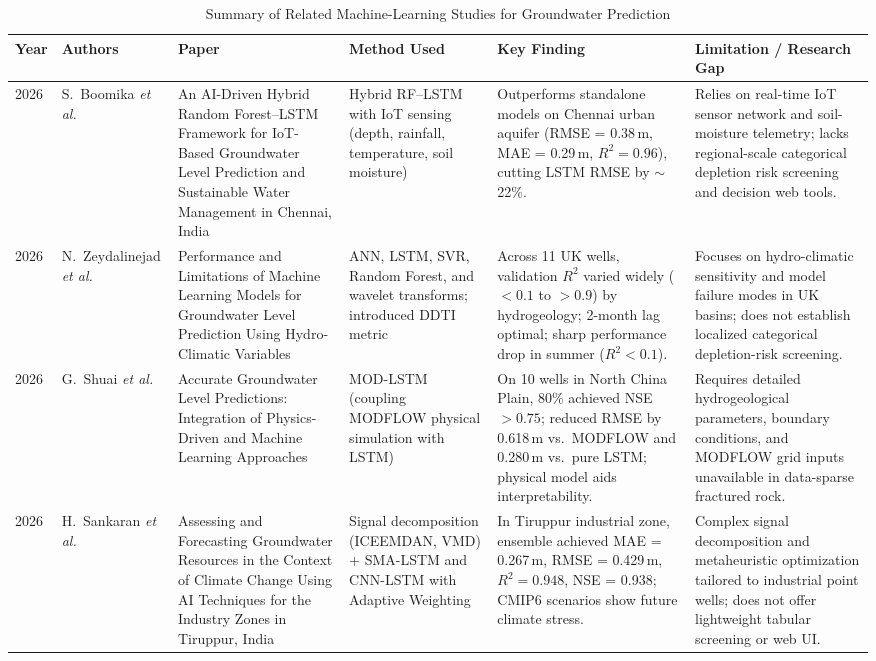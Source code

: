 \documentclass[conference]{IEEEtran}
\begin{document}
\begin{table}[t]
\caption{Summary of Related Machine-Learning Studies for Groundwater Prediction}
\label{tab:relwork}
\centering
\scriptsize
\setlength{\tabcolsep}{3.0pt}
\renewcommand{\arraystretch}{1.08}
\begin{tabular}{p{0.6cm} p{1.9cm} p{3.6cm} p{2.7cm} p{3.7cm} p{3.9cm}}
\toprule
\textbf{Year} & \textbf{Authors} & \textbf{Paper} & \textbf{Method Used} & \textbf{Key Finding} & \textbf{Limitation / Research Gap} \\
\midrule
2026 & S.~Boomika \emph{et al.} \cite{boomika2026} & An AI-Driven Hybrid Random Forest--LSTM Framework for IoT-Based Groundwater Level Prediction and Sustainable Water Management in Chennai, India & Hybrid RF--LSTM with IoT sensing (depth, rainfall, temperature, soil moisture) & Outperforms standalone models on Chennai urban aquifer (RMSE = 0.38\,m, MAE = 0.29\,m, $R^2 = 0.96$), cutting LSTM RMSE by $\sim$22\%. & Relies on real-time IoT sensor network and soil-moisture telemetry; lacks regional-scale categorical depletion risk screening and decision web tools. \\
\midrule
2026 & N.~Zeydalinejad \emph{et al.} \cite{zeydalinejad2026} & Performance and Limitations of Machine Learning Models for Groundwater Level Prediction Using Hydro-Climatic Variables & ANN, LSTM, SVR, Random Forest, and wavelet transforms; introduced DDTI metric & Across 11 UK wells, validation $R^2$ varied widely ($<0.1$ to $>0.9$) by hydrogeology; 2-month lag optimal; sharp performance drop in summer ($R^2 < 0.1$). & Focuses on hydro-climatic sensitivity and model failure modes in UK basins; does not establish localized categorical depletion-risk screening. \\
\midrule
2026 & G.~Shuai \emph{et al.} \cite{shuai2026} & Accurate Groundwater Level Predictions: Integration of Physics-Driven and Machine Learning Approaches & MOD-LSTM (coupling MODFLOW physical simulation with LSTM) & On 10 wells in North China Plain, 80\% achieved NSE $> 0.75$; reduced RMSE by 0.618\,m vs.\ MODFLOW and 0.280\,m vs.\ pure LSTM; physical model aids interpretability. & Requires detailed hydrogeological parameters, boundary conditions, and MODFLOW grid inputs unavailable in data-sparse fractured rock. \\
\midrule
2026 & H.~Sankaran \emph{et al.} \cite{sankaran2026} & Assessing and Forecasting Groundwater Resources in the Context of Climate Change Using AI Techniques for the Industry Zones in Tiruppur, India & Signal decomposition (ICEEMDAN, VMD) + SMA-LSTM and CNN-LSTM with Adaptive Weighting & In Tiruppur industrial zone, ensemble achieved MAE = 0.267\,m, RMSE = 0.429\,m, $R^2 = 0.948$, NSE = 0.938; CMIP6 scenarios show future climate stress. & Complex signal decomposition and metaheuristic optimization tailored to industrial point wells; does not offer lightweight tabular screening or web UI. \\

\end{tabular}
\end{table}
\end{document}
